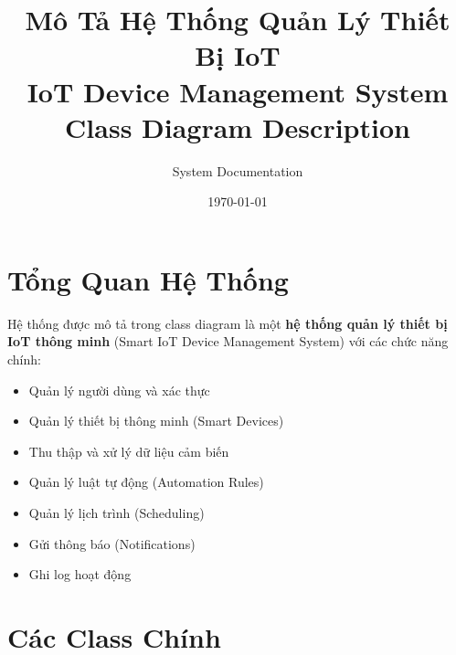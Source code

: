 \documentclass[12pt,a4paper]{article}
\title{Mô Tả Hệ Thống Quản Lý Thiết Bị IoT\\
\large{IoT Device Management System Class Diagram Description}}
\author{System Documentation}
\date{\today}
\begin{document}
\maketitle

\section{Tổng Quan Hệ Thống}

Hệ thống được mô tả trong class diagram là một \textbf{hệ thống quản lý thiết bị IoT thông minh} (Smart IoT Device Management System) với các chức năng chính:
\begin{itemize}
    \item Quản lý người dùng và xác thực
    \item Quản lý thiết bị thông minh (Smart Devices)
    \item Thu thập và xử lý dữ liệu cảm biến
    \item Quản lý luật tự động (Automation Rules)
    \item Quản lý lịch trình (Scheduling)
    \item Gửi thông báo (Notifications)
    \item Ghi log hoạt động
\end{itemize}

\section{Các Class Chính}
\end{document}
